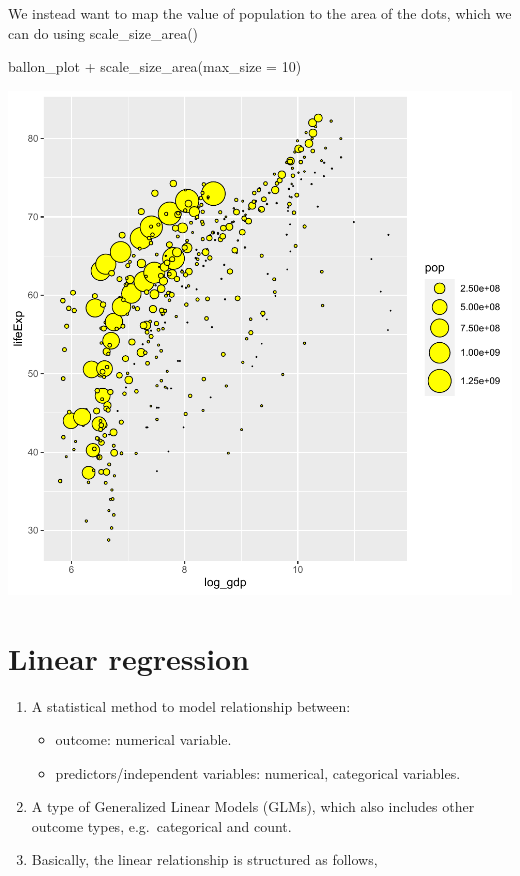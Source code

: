 \documentclass[
]{book}
\makeatletter
\newenvironment{Shaded}{\begin{snugshade}}{\end{snugshade}}
\newcommand{\AttributeTok}[1]{\textcolor[rgb]{0.61,0.61,0.61}{#1}}
\newcommand{\DecValTok}[1]{\textcolor[rgb]{0.06,0.06,0.06}{#1}}
\newcommand{\FunctionTok}[1]{\textcolor[rgb]{0,0,0}{#1}}
\newcommand{\NormalTok}[1]{#1}
\newcommand{\SpecialCharTok}[1]{\textcolor[rgb]{0,0,0}{#1}}
\providecommand{\tightlist}{%
  \setlength{\itemsep}{0pt}\setlength{\parskip}{0pt}}
\newenvironment{kframe}{%
\medskip{}
\setlength{\fboxsep}{.8em}
 \def\at@end@of@kframe{}%
 \ifinner\ifhmode%
  \def\at@end@of@kframe{\end{minipage}}%
  \begin{minipage}{\columnwidth}%
 \fi\fi%
 \def\FrameCommand##1{\hskip\@totalleftmargin \hskip-\fboxsep
 \colorbox{shadecolor}{##1}\hskip-\fboxsep
     \hskip-\linewidth \hskip-\@totalleftmargin \hskip\columnwidth}%
 \MakeFramed {\advance\hsize-\width
   \@totalleftmargin\z@ \linewidth\hsize
   \@setminipage}}%
 {\par\unskip\endMakeFramed%
 \at@end@of@kframe}
\renewenvironment{Shaded}{\begin{kframe}}{\end{kframe}}
\makeatother
\begin{document}
We instead want to map the value of population to the area of the dots, which we can do using scale\_size\_area()

\begin{Shaded}
\begin{Highlighting}[]
\NormalTok{ballon\_plot }\SpecialCharTok{+} \FunctionTok{scale\_size\_area}\NormalTok{(}\AttributeTok{max\_size =} \DecValTok{10}\NormalTok{)}
\end{Highlighting}
\end{Shaded}

\begin{center}\includegraphics[width=0.7\linewidth,keepaspectratio]{Multivariable_Data_Analysis_files/figure-latex/unnamed-chunk-98-1} \end{center}

\hypertarget{linear-regression}{%
\chapter{Linear regression}\label{linear-regression}}

\begin{enumerate}
\def\labelenumi{\arabic{enumi}.}
\item
  A statistical method to model relationship between:

  \begin{itemize}
  \tightlist
  \item
    outcome: numerical variable.
  \item
    predictors/independent variables: numerical, categorical variables.
  \end{itemize}
\item
  A type of Generalized Linear Models (GLMs), which also includes other outcome types, e.g.~categorical and count.
\item
  Basically, the linear relationship is structured as follows,
\end{enumerate}
\end{document}
